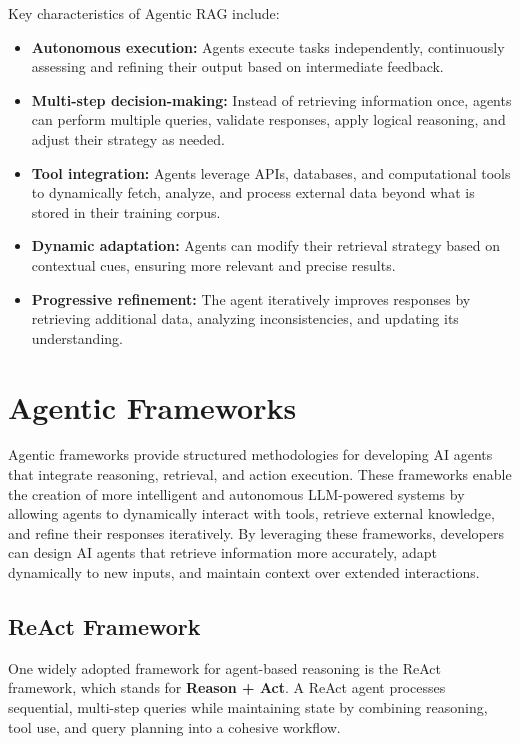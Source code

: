 Key characteristics of Agentic RAG include:

\begin{itemize}
    \item \textbf{Autonomous execution:} Agents execute tasks independently, continuously assessing and refining their output based on intermediate feedback.
    \item \textbf{Multi-step decision-making:} Instead of retrieving information once, agents can perform multiple queries, validate responses, apply logical reasoning, and adjust their strategy as needed.
    \item \textbf{Tool integration:} Agents leverage APIs, databases, and computational tools to dynamically fetch, analyze, and process external data beyond what is stored in their training corpus.
    \item \textbf{Dynamic adaptation:} Agents can modify their retrieval strategy based on contextual cues, ensuring more relevant and precise results.
    \item \textbf{Progressive refinement:} The agent iteratively improves responses by retrieving additional data, analyzing inconsistencies, and updating its understanding.
\end{itemize}

\section{Agentic Frameworks}

Agentic frameworks provide structured methodologies for developing AI agents that integrate reasoning, retrieval, and action execution. These frameworks enable the creation of more intelligent and autonomous LLM-powered systems by allowing agents to dynamically interact with tools, retrieve external knowledge, and refine their responses iteratively. By leveraging these frameworks, developers can design AI agents that retrieve information more accurately, adapt dynamically to new inputs, and maintain context over extended interactions.


\subsection{ReAct Framework}

One widely adopted framework for agent-based reasoning is the ReAct framework, which stands for \textbf{Reason + Act}. A ReAct agent processes sequential, multi-step queries while maintaining state by combining reasoning, tool use, and query planning into a cohesive workflow.

